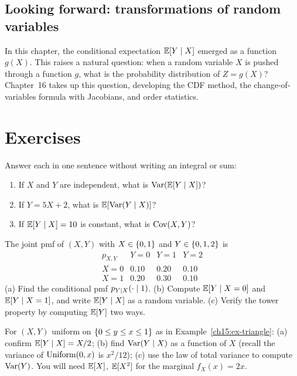 \subsection*{Looking forward: transformations of random variables}
In this chapter, the conditional expectation $\operatorname{\mathbb{E}}[Y \mid X]$ emerged as a function $g(X)$.
This raises a natural question: when a random variable $X$ is pushed through a function $g$,
what is the probability distribution of $Z = g(X)$?
Chapter~16 takes up this question, developing the CDF method, the change-of-variables
formula with Jacobians, and order statistics.

\section{Exercises}
\label{ch15:exercises}

\begin{exercise}
\label{ch15:exr-mental-warmup}
Answer each in one sentence without writing an integral or sum:
\begin{enumerate}[label=(\alph*)]
  \item If $X$ and $Y$ are independent, what is $\operatorname{Var}(\operatorname{\mathbb{E}}[Y\mid X])$?
  \item If $Y = 5X + 2$, what is $\operatorname{\mathbb{E}}[\operatorname{Var}(Y\mid X)]$?
  \item If $\operatorname{\mathbb{E}}[Y\mid X] = 10$ is constant, what is $\operatorname{Cov}(X, Y)$?
\end{enumerate}
\end{exercise}

\begin{exercise}
\label{ch15:exr-table}
The joint pmf of $(X,Y)$ with $X \in \{0,1\}$ and $Y \in \{0,1,2\}$ is
\[
  \begin{array}{c|ccc}
    p_{X,Y} & Y{=}0 & Y{=}1 & Y{=}2 \\\hline
    X{=}0 & 0.10 & 0.20 & 0.10 \\
    X{=}1 & 0.20 & 0.30 & 0.10
  \end{array}
\]
(a) Find the conditional pmf $p_{Y\mid X}(\cdot\mid 1)$. (b) Compute $\operatorname{\mathbb{E}}[Y\mid X = 0]$ and
$\operatorname{\mathbb{E}}[Y\mid X=1]$, and write $\operatorname{\mathbb{E}}[Y\mid X]$ as a random variable. (c) Verify the tower property by
computing $\operatorname{\mathbb{E}}[Y]$ two ways.
\end{exercise}

\begin{exercise}
\label{ch15:exr-triangle}
For $(X,Y)$ uniform on $\{0\le y \le x \le 1\}$ as in Example~\ref{ch15:ex-triangle}: (a) confirm
$\operatorname{\mathbb{E}}[Y\mid X] = X/2$; (b) find $\operatorname{Var}(Y\mid X)$ as a function of $X$ (recall the variance of
$\operatorname{Uniform}(0,x)$ is $x^2/12$); (c) use the law of total variance to compute $\operatorname{Var}(Y)$. You will need
$\operatorname{\mathbb{E}}[X]$, $\operatorname{\mathbb{E}}[X^2]$ for the marginal $f_X(x) = 2x$.
\end{exercise}

